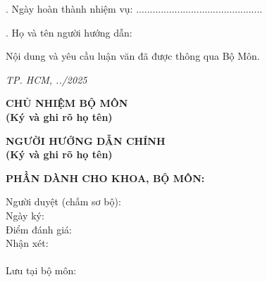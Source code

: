 \vspace{0.2cm}
. Ngày hoàn thành nhiệm vụ: ..............................................

\vspace{0.2cm}
. Họ và tên người hướng dẫn: \TENCANBO

\vspace{0.4cm}
\noindent Nội dung và yêu cầu luận văn đã được thông qua Bộ Môn.

\vspace{0.3cm}
\noindent \hfill \textit{TP. HCM, ../2025}

\vspace{0.5cm}
\begin{center}
\begin{minipage}[t]{0.48\textwidth}
\centering
\textbf{CHỦ NHIỆM BỘ MÔN} \\[1.5cm]
\textbf{\small (Ký và ghi rõ họ tên)}
\end{minipage}
\hfill
\begin{minipage}[t]{0.48\textwidth}
\centering
\textbf{NGƯỜI HƯỚNG DẪN CHÍNH} \\[1.5cm]
\textbf{\small (Ký và ghi rõ họ tên)}
\end{minipage}
\end{center}


\vspace{0.3cm}
\noindent
\textbf{PHẦN DÀNH CHO KHOA, BỘ MÔN:}

\small
\begin{minipage}[t]{0.95\textwidth} %
Người duyệt (chấm sơ bộ): \dotfill \\[0.2cm]
Ngày ký: \dotfill \\[0.2cm]
Điểm đánh giá: \dotfill \\[0.2cm]
Nhận xét: \dotfill \\[0.2cm]
\phantom{Nhận xét: } \dotfill \\[0.2cm]
Lưu tại bộ môn: \dotfill
\end{minipage}
